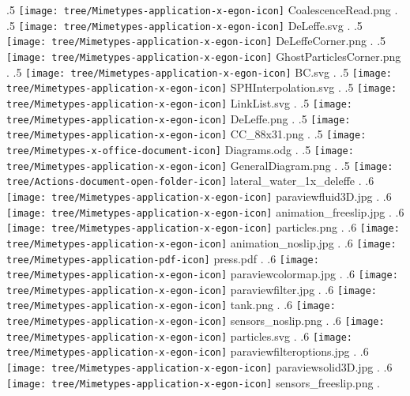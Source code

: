{.5 { \texttt{[image: tree/Mimetypes-application-x-egon-icon]} CoalescenceRead.png }.
.5 { \texttt{[image: tree/Mimetypes-application-x-egon-icon]} DeLeffe.svg }.
.5 { \texttt{[image: tree/Mimetypes-application-x-egon-icon]} DeLeffeCorner.png }.
.5 { \texttt{[image: tree/Mimetypes-application-x-egon-icon]} GhostParticlesCorner.png }.
.5 { \texttt{[image: tree/Mimetypes-application-x-egon-icon]} BC.svg }.
.5 { \texttt{[image: tree/Mimetypes-application-x-egon-icon]} SPHInterpolation.svg }.
.5 { \texttt{[image: tree/Mimetypes-application-x-egon-icon]} LinkList.svg }.
.5 { \texttt{[image: tree/Mimetypes-application-x-egon-icon]} DeLeffe.png }.
.5 { \texttt{[image: tree/Mimetypes-application-x-egon-icon]} CC\_88x31.png }.
.5 { \texttt{[image: tree/Mimetypes-x-office-document-icon]} Diagrams.odg }.
.5 { \texttt{[image: tree/Mimetypes-application-x-egon-icon]} GeneralDiagram.png }.
.5 { \texttt{[image: tree/Actions-document-open-folder-icon]} lateral\_water\_1x\_deleffe }.
.6 { \texttt{[image: tree/Mimetypes-application-x-egon-icon]} paraviewfluid3D.jpg }.
.6 { \texttt{[image: tree/Mimetypes-application-x-egon-icon]} animation\_freeslip.jpg }.
.6 { \texttt{[image: tree/Mimetypes-application-x-egon-icon]} particles.png }.
.6 { \texttt{[image: tree/Mimetypes-application-x-egon-icon]} animation\_noslip.jpg }.
.6 { \texttt{[image: tree/Mimetypes-application-pdf-icon]} press.pdf }.
.6 { \texttt{[image: tree/Mimetypes-application-x-egon-icon]} paraviewcolormap.jpg }.
.6 { \texttt{[image: tree/Mimetypes-application-x-egon-icon]} paraviewfilter.jpg }.
.6 { \texttt{[image: tree/Mimetypes-application-x-egon-icon]} tank.png }.
.6 { \texttt{[image: tree/Mimetypes-application-x-egon-icon]} sensors\_noslip.png }.
.6 { \texttt{[image: tree/Mimetypes-application-x-egon-icon]} particles.svg }.
.6 { \texttt{[image: tree/Mimetypes-application-x-egon-icon]} paraviewfilteroptions.jpg }.
.6 { \texttt{[image: tree/Mimetypes-application-x-egon-icon]} paraviewsolid3D.jpg }.
.6 { \texttt{[image: tree/Mimetypes-application-x-egon-icon]} sensors\_freeslip.png }.
}
